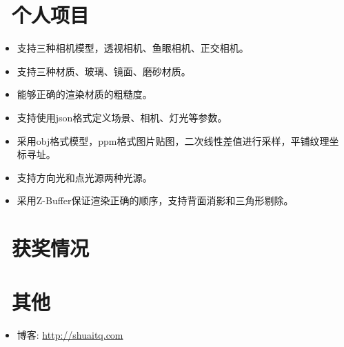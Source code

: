 \documentclass{resume}
\begin{document}

\section{\faGithubAlt\ 个人项目}
\begin{itemize}
  \item 支持三种相机模型，透视相机、鱼眼相机、正交相机。
  \item 支持三种材质、玻璃、镜面、磨砂材质。
  \item 能够正确的渲染材质的粗糙度。
\end{itemize}


\begin{itemize}
  \item 支持使用json格式定义场景、相机、灯光等参数。
  \item 采用obj格式模型，ppm格式图片贴图，二次线性差值进行采样，平铺纹理坐标寻址。
  \item 支持方向光和点光源两种光源。
  \item 采用Z-Buffer保证渲染正确的顺序，支持背面消影和三角形剔除。
\end{itemize}

\section{\faHeartO\ 获奖情况}

\section{\faInfo\ 其他}
\begin{itemize}[parsep=0.5ex]
  \item 博客: \url{http://shuaitq.com}
\end{itemize}

%
%
\end{document}
